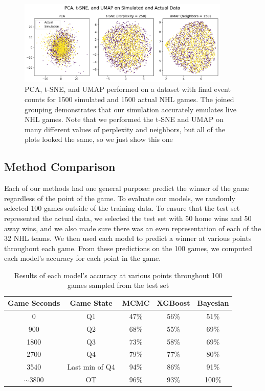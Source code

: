 \documentclass[11pt]{article}
\begin{document}
\begin{figure}
    \centering
    \includegraphics[width=0.9\textwidth]{images/pca_tsne_umap_sim_act.png}
    \caption{PCA, t-SNE, and UMAP performed on a dataset with final event counts for 1500 simulated and 1500 actual NHL games. The joined grouping demonstrates that our simulation accurately emulates live NHL games. Note that we performed the t-SNE and UMAP on many different values of perplexity and neighbors, but all of the plots looked the same, so we just show this one}
    \label{fig:simulation_v_actual}
\end{figure}

\subsection{Method Comparison}
Each of our methods had one general purpose: predict the winner of the game regardless of the point of the game. To evaluate our models, we randomly selected 100 games outside of the training data. To ensure that the test set represented the actual data, we selected the test set with 50 home wins and 50 away wins, and we also made sure there was an even representation of each of the 32 NHL teams. We then used each model to predict a winner at various points throughout each game. From these predictions on the 100 games, we computed each model's accuracy for each point in the game.

\begin{table}
    \centering
    \begin{tabular}{ |c|c|c|c|c| } 
    \hline
    \textbf{Game Seconds} & \textbf{Game State} & \textbf{MCMC} & \textbf{XGBoost} & \textbf{Bayesian} \\ 
    \hline
    0 & Q1 & 47\% & 56\% & 51\% \\ 
    \hline
    900 & Q2 & 68\% & 55\% & 69\% \\
    \hline
    1800 & Q3 & 73\% & 58\% & 69\% \\
    \hline
    2700 & Q4 & 79\% & 77\% & 80\% \\
    \hline
    3540 & Last min of Q4 & 94\% & 86\% & 91\% \\
    \hline
     \(\sim \)3800 & OT & 96\% & 93\% & 100\% \\
    \hline
    \end{tabular}
    \caption{Results of each model's accuracy at various points throughout 100 games sampled from the test set}
    \label{tab:game_accuracies}
\end{table}
\end{document}
